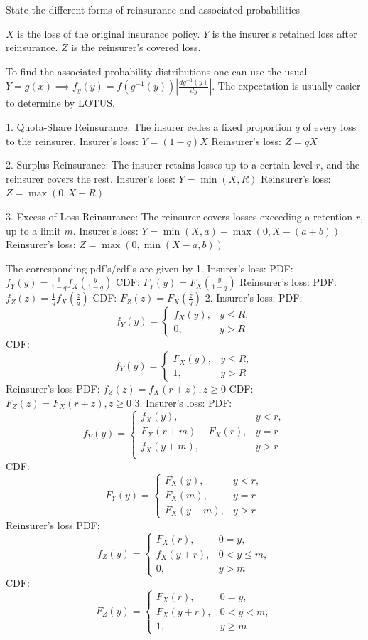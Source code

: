 \documentclass[11pt,a4paper,twoside]{article}
\begin{document}
State the different forms of reinsurance and associated probabilities

$ X $ is the loss of the original insurance policy.
$ Y $ is the insurer’s retained loss after reinsurance.
$ Z $ is the reinsurer’s covered loss.

To find the associated probability distributions one can use the usual $ Y = g(x) \implies f_y(y) = f(g^{-1}(y))|\frac{dg^{-1}(y)}{dy}| $.
The expectation is usually easier to determine by LOTUS.

1. Quota-Share Reinsurance:
The insurer cedes a fixed proportion $ q $ of every loss to the reinsurer.
Insurer’s loss:
$
Y = (1 - q)X
$
Reinsurer’s loss:
$
Z = qX
$

2. Surplus Reinsurance:
The insurer retains losses up to a certain level $ r $, and the reinsurer covers the rest.
Insurer’s loss:
$ Y = \min(X, R) $
Reinsurer’s loss:
$Z = \max(0, X - R)$

3. Excess-of-Loss Reinsurance:
The reinsurer covers losses exceeding a retention $ r $, up to a limit $ m $.
Insurer’s loss:
$  Y = \min(X, a) + \max(0, X - (a + b)) $
Reinsurer’s loss:
$ Z = \max(0, \min(X - a, b)) $

The corresponding pdf's/cdf's are given by
1.
Insurer's loss:
PDF: $ f_Y(y) = \frac{1}{1 - q} f_X\left(\frac{y}{1 - q}\right) $
CDF: $ F_Y(y) = F_X\left(\frac{y}{1 - q}\right) $
Reinsurer’s loss:
PDF: $ f_Z(z) = \frac{1}{q} f_X\left(\frac{z}{q}\right) $
CDF: $ F_Z(z) = F_X\left(\frac{z}{q}\right) $
2.
Insurer's loss:
PDF:
\[
f_Y(y) =
\begin{cases}
f_X(y), & y \leq R, \\
0, & y > R
\end{cases}
\]
CDF:
\[
f_Y(y) =
\begin{cases}
F_X(y), & y \leq R, \\
1, & y > R
\end{cases}
\]
Reinsurer's loss
PDF:
$f_Z(z) = f_X(r + z), z \geq 0$
CDF:
$F_Z(z) = F_X(r + z), z \geq 0$
3.
Insurer's loss:
PDF:
\[
f_Y(y) =
\begin{cases}
f_X(y), & y < r, \\
F_X(r + m) - F_X(r), & y = r \\
f_X(y + m), & y > r \\
\end{cases}
\]
CDF:
\[
F_Y(y) =
\begin{cases}
F_X(y), & y < r, \\
F_X(m), & y = r \\
F_X(y + m), & y > r 
\end{cases}
\]
Reinsurer's loss
PDF:
\[
f_Z(y) =
\begin{cases}
F_X(r), & 0 = y, \\
f_X(y + r), & 0 < y \leq m, \\
0, & y > m
\end{cases}
\]
CDF:
\[
F_Z(y) =
\begin{cases}
F_X(r), & 0 = y, \\
F_X(y + r), & 0 < y < m, \\
1, & y \geq m
\end{cases}
\]
\end{document}
